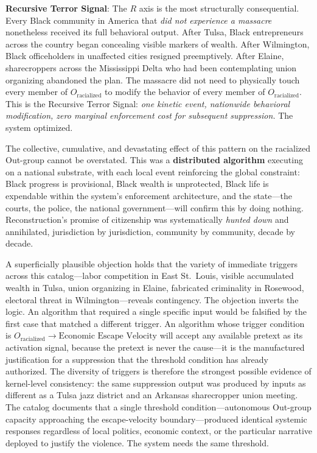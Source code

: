 \textbf{Recursive Terror Signal}: The $R$ axis is the most structurally consequential. Every Black community in America that \textit{did not experience a massacre} nonetheless received its full behavioral output. After Tulsa, Black entrepreneurs across the country began concealing visible markers of wealth. After Wilmington, Black officeholders in unaffected cities resigned preemptively. After Elaine, sharecroppers across the Mississippi Delta who had been contemplating union organizing abandoned the plan. The massacre did not need to physically touch every member of $O_{\text{racialized}}$ to modify the behavior of every member of $O_{\text{racialized}}$. This is the Recursive Terror Signal: \textit{one kinetic event, nationwide behavioral modification, zero marginal enforcement cost for subsequent suppression.} The system optimized.

The collective, cumulative, and devastating effect of this pattern on the racialized Out-group cannot be overstated. This was a \textbf{distributed algorithm} executing on a national substrate, with each local event reinforcing the global constraint: Black progress is provisional, Black wealth is unprotected, Black life is expendable within the system's enforcement architecture, and the state---the courts, the police, the national government---will confirm this by doing nothing. Reconstruction's promise of citizenship was systematically \textit{hunted down} and annihilated, jurisdiction by jurisdiction, community by community, decade by decade.

A superficially plausible objection holds that the variety of immediate triggers across this catalog---labor competition in East St.\ Louis, visible accumulated wealth in Tulsa, union organizing in Elaine, fabricated criminality in Rosewood, electoral threat in Wilmington---reveals contingency. The objection inverts the logic. An algorithm that required a single specific input would be falsified by the first case that matched a different trigger. An algorithm whose trigger condition is $O_{\text{racialized}} \to \text{Economic Escape Velocity}$ will accept any available pretext as its activation signal, because the pretext is never the cause---it is the manufactured justification for a suppression that the threshold condition has already authorized. The diversity of triggers is therefore the strongest possible evidence of kernel-level consistency: the same suppression output was produced by inputs as different as a Tulsa jazz district and an Arkansas sharecropper union meeting. The catalog documents that a single threshold condition---autonomous Out-group capacity approaching the escape-velocity boundary---produced identical systemic responses regardless of local politics, economic context, or the particular narrative deployed to justify the violence. The system needs the same threshold.


